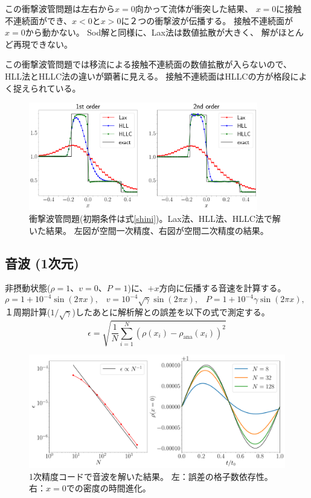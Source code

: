 この衝撃波管問題は左右から$x=0$向かって流体が衝突した結果、
$x=0$に接触不連続面ができ、$x<0$と$x>0$に２つの衝撃波が伝播する。
接触不連続面が$x=0$から動かない。
Sod解と同様に、Lax法は数値拡散が大きく、
解がほとんど再現できない。

この衝撃波管問題では移流による接触不連続面の数値拡散が入らないので、
HLL法とHLLC法の違いが顕著に見える。
接触不連続面はHLLCの方が格段によく捉えられている。


\begin{figure}[htpb]
    \centering
    \includegraphics[width=10cm]{figures/sh_lax_hll_hllc.pdf}
    \caption{衝撃波管問題(初期条件は式\ref{shini})。Lax法、HLL法、HLLC法で解いた結果。
    左図が空間一次精度、右図が空間二次精度の結果。
    }
    \label{fig:laxhllhllc}
\end{figure}

\clearpage
\subsection{音波 (1次元)}

非摂動状態($\rho=1$、$v=0$、$P=1$)に、$+x$方向に伝播する音速を計算する。
\begin{equation}
\rho = 1 + 10^{-4}\sin(2\pi x),\;\;\;
v = 10^{-4}\sqrt{\gamma}\sin(2\pi x),\;\;\;
P = 1 + 10^{-4}\gamma \sin(2\pi x),\;\;\;
\end{equation}
１周期計算($1/\sqrt{\gamma}$)したあとに解析解との誤差を以下の式で測定する。
\begin{equation}
    \epsilon = \sqrt{ \frac{1}{N} \sum_{i=1}^N \left(\rho(x_i) - \rho_\mathrm{ana}(x_i)\right)^2}
\end{equation}

\begin{figure}[htpb]
    \centering
    \includegraphics[width=16cm]{figures/sound.pdf}
    \caption{
    1次精度コードで音波を解いた結果。
    左：誤差の格子数依存性。右：$x=0$での密度の時間進化。
    }
    \label{fig:laxhllhllc}
\end{figure}

